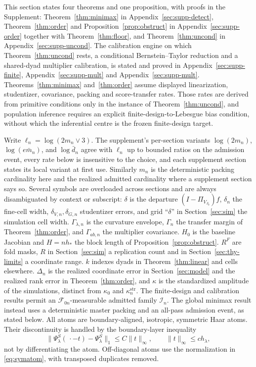\documentclass[11pt]{article}
\theoremstyle{definition}
\newcommand{\1}{\mathbf 1}\newcommand{\op}{\operatorname}
\newcommand{\cI}{\mathcal I}\newcommand{\cJ}{\mathcal J}\newcommand{\cF}{\mathcal F}
\begin{document}
This section states four theorems and one proposition, with proofs in the
Supplement: Theorem~\ref{thm:minimax} in Appendix~\ref{sec:supp-detect},
Theorem~\ref{thm:order} and Proposition~\ref{prop:obstruct} in
Appendix~\ref{sec:supp-order} together with Theorem~\ref{thm:floor}, and
Theorem~\ref{thm:uncond} in Appendix~\ref{sec:supp-uncond}.  The calibration
engine on which Theorem~\ref{thm:uncond} rests, a conditional
Bernstein--Taylor reduction and a shared-dyad multiplier calibration, is
stated and proved in Appendix~\ref{sec:supp-finite}, Appendix~\ref{sec:supp-mult}
and Appendix~\ref{sec:supp-mult}.  Theorems~\ref{thm:minimax}
and~\ref{thm:order} assume displayed linearization, studentizer, covariance,
packing and score-transfer rates.  Those rates are derived from primitive
conditions only in the instance of Theorem~\ref{thm:uncond}, and population
inference requires an explicit finite-design-to-Lebesgue bias condition,
without which the inferential centre is the frozen finite-design target.

Write $\ell_n=\log(2m_n\vee3)$.  The supplement's per-section variants
$\log(2m_n)$, $\log(e\bar m_n)$, and $\log\bar d_n$ agree with $\ell_n$ up to
bounded ratios on the admission event, every rate below is insensitive to the
choice, and each supplement section states its local variant at first use.
Similarly $m_n$ is the deterministic packing cardinality here and the realized
admitted cardinality where a supplement section says so.  Several symbols are
overloaded across sections and are always disambiguated by context or subscript:
$\delta$ is the departure $(I-\Pi_{V_{J_0}})f$, $\delta_n$ the fine-cell width,
$\delta_{V,n},\delta_{G,n}$ studentizer errors, and grid ``$\delta$'' in
Section~\ref{sec:sim} the simulation cell width.  $\Gamma_{\lambda,n}$ is the
curvature envelope, $\Gamma_n$ the transfer margin of
Theorem~\ref{thm:order}, and $\Gamma_{ab,n}$ the multiplier covariance.  $H_0$
is the baseline Jacobian and $H=nh_*$ the block length of
Proposition~\ref{prop:obstruct}.  $R^F$ are fold masks, $R$ in Section~\ref{sec:sim}
a replication count and in Section~\ref{sec:thy-limits} a coordinate range.  $k$ indexes
dyads in Theorem~\ref{thm:linear} and cells elsewhere.  $\Delta_n$ is the realized
coordinate error in Section~\ref{sec:model} and the realized rank error in
Theorem~\ref{thm:order}, and $\kappa$ is the standardized amplitude of the
simulations, distinct from $\kappa_0$ and $\kappa_n^{\mathrm{str}}$.  The finite-design and calibration results permit an
$\mathcal F_{0n}$-measurable admitted family $\cI_n$.  The global minimax result instead
uses a deterministic master packing and an all-pass admission event, as stated below.
All atoms are boundary-aligned, isotropic, symmetric Haar atoms.  Their discontinuity
is handled by the boundary-layer inequality
\begin{equation}
 \|\Psi_\lambda^S(\,\cdot-t)-\Psi_\lambda^S\|_1
 \le C\|t\|_\infty,
 \qquad \|t\|_\infty\le c h_\lambda,                            \label{app:eq-bvtranslate}
\end{equation}
not by differentiating the atom.  Off-diagonal atoms use the normalization in
\eqref{eq:symatom}, with transposed duplicates removed.
\end{document}
